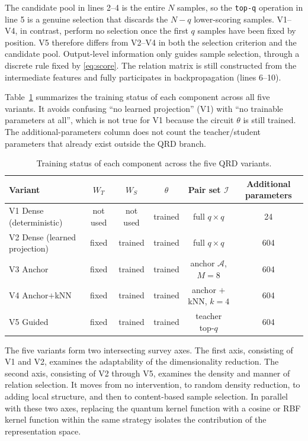 The candidate pool in lines 2--4 is the entire $N$ samples, so the
\texttt{top-q} operation in line 5 is a genuine selection that
discards the $N - q$ lower-scoring samples. V1--V4, in contrast,
perform no selection once the first $q$ samples have been fixed by
position. V5 therefore differs from V2--V4 in both the selection
criterion and the candidate pool. Output-level information only
guides sample selection, through a discrete rule fixed by
\eqref{eq:score}. The relation matrix is still constructed from the
intermediate features and fully participates in backpropagation
(lines 6--10).

Table~\ref{tab:bienthe_cauhinh} summarizes the training status of each component across all five variants. It avoids confusing ``no learned projection'' (V1) with ``no trainable parameters at all'', which is not true for V1 because the circuit $\theta$ is still trained. The additional-parameters column does not count the
teacher/student parameters that already exist outside the QRD
branch.

\begin{table}[!htbp]
\centering
\caption{Training status of each component across the five QRD variants.}
\label{tab:bienthe_cauhinh}
\small
\begin{tabular}{lccccc}
\toprule
\textbf{Variant} & $W_T$ & $W_S$ & $\theta$ & Pair set $\mathcal{I}$ & Additional parameters \\
\midrule
V1 Dense (deterministic) & not used & not used & trained & full $q\times q$ & 24 \\
V2 Dense (learned projection) & fixed & trained & trained & full $q\times q$ & 604 \\
V3 Anchor & fixed & trained & trained & anchor $\mathcal{A}$, $M{=}8$ & 604 \\
V4 Anchor$+$kNN & fixed & trained & trained & anchor $+$ kNN, $k{=}4$ & 604 \\
V5 Guided & fixed & trained & trained & teacher top-$q$ & 604 \\
\bottomrule
\end{tabular}
\end{table}
\FloatBarrier

The five variants form two intersecting survey axes. The first axis,
consisting of V1 and V2, examines the adaptability of the
dimensionality reduction. The second axis, consisting of V2 through
V5, examines the density and manner of relation selection. It moves from no intervention, to random density reduction, to adding local structure, and then to content-based sample selection. In parallel
with these two axes, replacing the quantum kernel function with a
cosine or RBF kernel function within the same strategy isolates the
contribution of the representation space.

